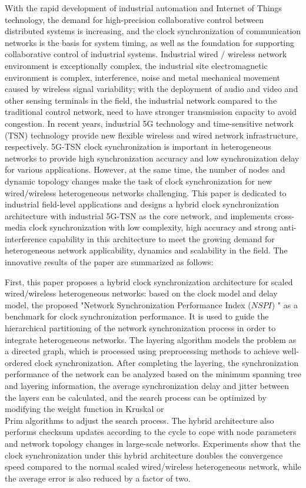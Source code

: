 \documentclass[UTF8,a4paper,12pt]{ctexart}
\numberwithin{equation}{section}
\begin{document}
With the rapid development of industrial automation and Internet of Things technology, the demand for high-precision collaborative control between distributed systems is increasing, and the clock synchronization of communication networks is the basis for system timing, as well as the foundation for supporting collaborative control of industrial systems. Industrial wired / wireless network environment is exceptionally complex, the industrial site electromagnetic environment is complex, interference, noise and metal mechanical movement caused by wireless signal variability; with the deployment of audio and video and other sensing terminals in the field, the industrial network compared to the traditional control network, need to have stronger transmission capacity to avoid congestion. In recent years, industrial 5G technology and time-sensitive network (TSN) technology provide new flexible wireless and wired network infrastructure, respectively. 5G-TSN clock synchronization is important in heterogeneous networks to provide high synchronization accuracy and low synchronization delay for various applications. However, at the same time, the number of nodes and dynamic topology changes make the task of clock synchronization for new wired/wireless heterogeneous networks challenging. This paper is dedicated to industrial field-level applications and designs a hybrid clock synchronization architecture with industrial 5G-TSN as the core network, and implements cross-media clock synchronization with low complexity, high accuracy and strong anti-interference capability in this architecture to meet the growing demand for heterogeneous network applicability, dynamics and scalability in the field. The innovative results of the paper are summarized as follows:

First, this paper proposes a hybrid clock synchronization architecture for scaled wired/wireless heterogeneous networks: based on the clock model and delay model, the proposed "Network Synchronization Performance Index ($NSPI$) " as a benchmark for clock synchronization performance. It is used to guide the hierarchical partitioning of the network synchronization process in order to integrate heterogeneous networks. The layering algorithm models the problem as a directed graph, which is processed using preprocessing methods to achieve well-ordered clock synchronization. After completing the layering, the synchronization performance of the network can be analyzed based on the minimum spanning tree and layering information, the average synchronization delay and jitter between the layers can be calculated, and the search process can be optimized by modifying the weight function in Kruskal or \\Prim algorithms to adjust the search process. The hybrid architecture also performs checksum updates according to the cycle to cope with node parameters and network topology changes in large-scale networks. Experiments show that the clock synchronization under this hybrid architecture doubles the convergence speed compared to the normal scaled wired/wireless heterogeneous network, while the average error is also reduced by a factor of two.
\end{document}
